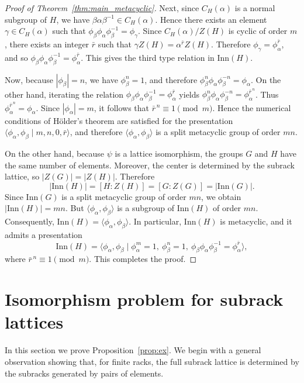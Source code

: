 \documentclass[a4paper,12pt]{article}
\theoremstyle{definition}
\theoremstyle{remark}
\begin{document}
\begin{proof}[Proof of Theorem~\ref{thm:main_metacyclic}]
  Next, since $C_H(\alpha)$ is a normal subgroup of $H$, we have $\beta\alpha\beta^{-1}\in C_H(\alpha)$. Hence there exists an element $\gamma\in C_H(\alpha)$ such that $\phi_\beta\phi_\alpha\phi_\beta^{-1}=\phi_\gamma$. Since $C_H(\alpha)/Z(H)$ is cyclic of order $m$, there exists an integer $\bar{r}$ such that $\gamma Z(H)=\alpha^{\bar r}Z(H)$. Therefore $\phi_\gamma=\phi_\alpha^{\bar r}$, and so $\phi_\beta\phi_\alpha\phi_\beta^{-1}=\phi_\alpha^{\bar r}$. This gives the third type relation in $\mathrm{Inn}(H)$.

  Now, because $|\phi_\beta|=n$, we have $\phi_\beta^n=1$, and therefore $\phi_\beta^n\phi_\alpha\phi_\beta^{-n}=\phi_\alpha$. On the other hand, iterating the relation $\phi_\beta\phi_\alpha\phi_\beta^{-1}=\phi_\alpha^{\bar r}$ yields $\phi_\beta^n\phi_\alpha\phi_\beta^{-n}=\phi_\alpha^{\bar r^{\,n}}$. Thus $\phi_\alpha^{\bar r^{\,n}}=\phi_\alpha$. Since $|\phi_\alpha|=m$, it follows that $\bar r^{\,n}\equiv 1 \pmod{m}$. Hence the numerical conditions of Hölder's theorem are satisfied for the presentation $\langle\phi_\alpha,\phi_\beta\mid m,n,0,\bar{r}\rangle$, and therefore $\langle \phi_\alpha,\phi_\beta\rangle$ is a split metacyclic group of order $mn$.

  On the other hand, because $\psi$ is a lattice isomorphism, the groups $G$ and $H$ have the same number of elements. Moreover, the center is determined by the subrack lattice, so $|Z(G)|=|Z(H)|$. Therefore
  $$ |\mathrm{Inn}(H)|=[H:Z(H)]=[G:Z(G)]=|\mathrm{Inn}(G)|. $$
  Since $\mathrm{Inn}(G)$ is a split metacyclic group of order $mn$, we obtain $|\mathrm{Inn}(H)|=mn$. But $\langle \phi_\alpha,\phi_\beta\rangle$ is a subgroup of $\mathrm{Inn}(H)$ of order $mn$. Consequently, $\mathrm{Inn}(H)=\langle \phi_\alpha,\phi_\beta\rangle$. In particular, $\mathrm{Inn}(H)$ is metacyclic, and it admits a presentation
  $$ \mathrm{Inn}(H) = \langle \phi_\alpha,\phi_\beta \mid \phi_\alpha^m=1,\ \phi_\beta^n=1,\ \phi_\beta\phi_\alpha\phi_\beta^{-1}=\phi_\alpha^{\bar r}\rangle, $$
  where $\bar r^{\,n}\equiv 1 \pmod m$. This completes the proof.


\end{proof}


\section{Isomorphism problem for subrack lattices}\label{sec:iso}

In this section we prove Proposition~\ref{prop:ex}. We begin with a general observation showing that, for finite racks, the full subrack lattice is determined by the subracks generated by pairs of elements.
\end{document}

